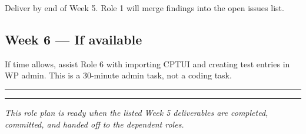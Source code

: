 \documentclass[11pt,a4paper]{article}
\newcommand{\grouprule}{\vspace{0.3em}\textcolor{ruleLine}{\rule{\linewidth}{0.4pt}}\vspace{0.3em}}
\begin{document}
Deliver by end of Week 5. Role 1 will merge findings into the open issues list.

\subsection{Week 6 — If available}

If time allows, assist Role 6 with importing CPTUI and creating test entries in WP admin. This is a 30-minute admin task, not a coding task.

\grouprule
\vspace{1.2em}
\textcolor{uvtYellow}{\rule{\linewidth}{1.5pt}}

{\small\textit{This role plan is ready when the listed Week 5 deliverables are completed, committed, and handed off to the dependent roles.}}
\end{document}
